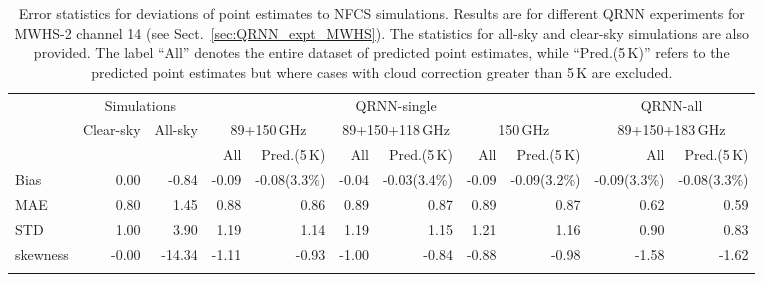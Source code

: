 \documentclass[amt, manuscript]{copernicus}
\begin{document}
\begin{table}[t]
	\caption{Error statistics for deviations of point estimates to NFCS simulations. Results are for different QRNN experiments for MWHS-2 channel 14 (see Sect.~\ref{sec:QRNN_expt_MWHS}). The statistics for all-sky and clear-sky simulations are also provided. The label ``All'' denotes the entire dataset of predicted point estimates, while ``Pred.(5\,K)'' refers to the predicted point estimates but where cases with cloud correction greater than 5\,K are excluded. }
	\label{tab:error_statistics_mwhs_14}
	\begin{tabular}{lrr|rr|rr|rr|rr}
		\tophline
		&\multicolumn{2}{c|}{Simulations}& \multicolumn{6}{c|}{QRNN-single} & \multicolumn{2}{c}{QRNN-all}\\
		\cline{2-11}
		&   Clear-sky &   All-sky &  \multicolumn{2}{c|}{89+150\,GHz} & \multicolumn{2}{c|}{89+150+118\,GHz} & \multicolumn{2}{c|}{150\,GHz} & \multicolumn{2}{c}{89+150+183\,GHz}\\		
		&			   &			& All & Pred.(5\,K) & All & Pred.(5\,K) & All & Pred.(5\,K)  & All & Pred.(5\,K)\\
		\middlehline
		Bias      &  0.00 &  -0.84 & -0.09 & -0.08(3.3\%) & -0.04 & -0.03(3.4\%) & -0.09 & -0.09(3.2\%) & -0.09(3.3\%) & -0.08(3.3\%)  \\
		MAE       &  0.80 &   1.45 &  0.88 &  0.86 &  0.89 &  0.87 &  0.89 &  0.87 &  0.62 &  0.59\\
		STD       &  1.00 &   3.90 &  1.19 &  1.14 &  1.19 &  1.15 &  1.21 &  1.16 &  0.90 &  0.83\\
		skewness & -0.00 & -14.34 & -1.11 & -0.93 & -1.00 & -0.84 & -0.88 & -0.98 & -1.58 & -1.62\\
		\bottomhline
	\end{tabular}
\end{table}
\end{document}
